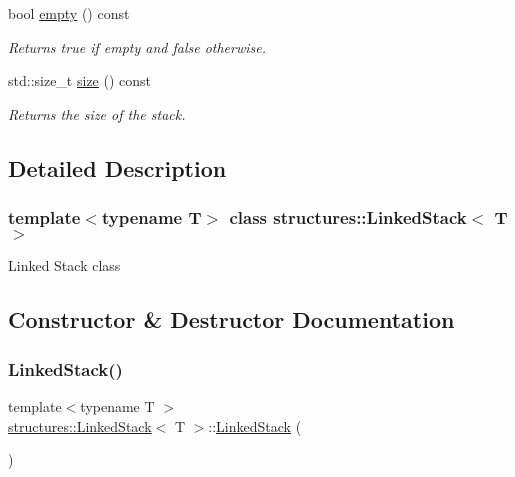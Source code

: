 \begin{DoxyCompactItemize}
bool \mbox{\hyperlink{classstructures_1_1LinkedStack_ac9704fd697f9c4ed4f7fc4e786114e4f}{empty}} () const
\begin{DoxyCompactList}\small\item\em Returns true if empty and false otherwise. \end{DoxyCompactList}\item 
std\+::size\+\_\+t \mbox{\hyperlink{classstructures_1_1LinkedStack_ae1ca6a5a9b837471863f1c8bb23cfe1d}{size}} () const
\begin{DoxyCompactList}\small\item\em Returns the size of the stack. \end{DoxyCompactList}\end{DoxyCompactItemize}


\subsection{Detailed Description}
\subsubsection*{template$<$typename T$>$\newline
class structures\+::\+Linked\+Stack$<$ T $>$}

Linked Stack class 

\subsection{Constructor \& Destructor Documentation}
\mbox{\label{classstructures_1_1LinkedStack_a546b827cccaa49b4f470110bc3a9004e}} 
\subsubsection{\texorpdfstring{Linked\+Stack()}{LinkedStack()}}
{\footnotesize\ttfamily template$<$typename T $>$ \\
\mbox{\hyperlink{classstructures_1_1LinkedStack}{structures\+::\+Linked\+Stack}}$<$ T $>$\+::\mbox{\hyperlink{classstructures_1_1LinkedStack}{Linked\+Stack}} (\begin{DoxyParamCaption}{ }\end{DoxyParamCaption})}



